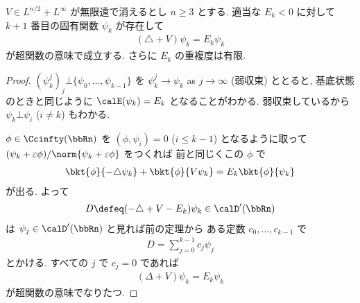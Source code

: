 \documentclass[openany, a4paper, oneside]{jsbook}
\begin{document}
\begin{thm}
$V \in L^{n/2} + L^{\infty}$ が無限遠で消えるとし $n \geq 3$ とする.
適当な $E_k < 0$ に対して $k + 1$ 番目の固有関数 $\psi_k$ が存在して
\begin{align}
 (\triangle + V) \psi_k = E_k \psi_k
\end{align}
が超関数の意味で成立する.
さらに $E_k$ の重複度は有限.
\end{thm}
\begin{proof}
$(\psi_k^j)_j \bot \{\psi_0, \dots, \psi_{k-1}  \}$ を $\psi_k^j \to \psi_k$  as  $j \to \infty$ (弱収束) ととると,
基底状態のときと同じように $\calE (\psi_k) = E_k$ となることがわかる.
弱収束しているから $\psi_k \bot \psi_i$ ($i \neq k$) もわかる.

$\phi \in \Ccinfty (\bbRn)$ を $(\phi, \psi_i) = 0$ ($i \le k-1$) となるように取って
$(\psi_k + \varepsilon \phi) / {\norm{\psi_k + \varepsilon \phi}}$ をつくれば
前と同じくこの $\phi$ で
\begin{align}
 \bkt{\phi}{- \triangle \psi_k} + \bkt{\phi}{V \psi_k}
 =
 E_k \bkt{\phi}{\psi_k}
\end{align}
が出る.
よって
\begin{align}
 D
 \defeq
 (- \triangle + V - E_k) \psi_k \in \calD' (\bbRn)
\end{align}
は $\psi_j \in \calD' (\bbRn)$ と見れば前の定理から
ある定数 $c_0, \dots, c_{k-1}$ で
\begin{align}
 D
 =
 \sum_{j=0}^{k-1} c_j \psi_j
\end{align}
とかける.
すべての $j$ で $c_j = 0$ であれば
\begin{align}
 (\Delta + V) \psi_k
 =
 E_k \psi_k
\end{align}
が超関数の意味でなりたつ.


\end{proof}
\end{document}
